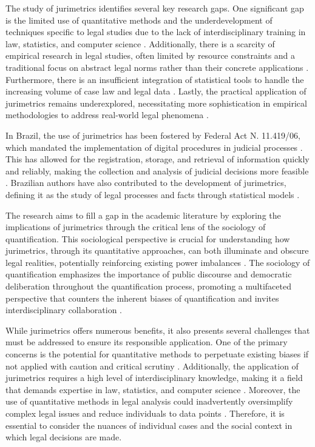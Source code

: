 The study of jurimetrics identifies several key research gaps. One significant gap is the limited use of quantitative methods and the underdevelopment of techniques specific to legal studies due to the lack of interdisciplinary training in law, statistics, and computer science \cite{nunes2018,nunes2018}. Additionally, there is a scarcity of empirical research in legal studies, often limited by resource constraints and a traditional focus on abstract legal norms rather than their concrete applications \cite{nunes2018}. Furthermore, there is an insufficient integration of statistical tools to handle the increasing volume of case law and legal data \cite{de2010}. Lastly, the practical application of jurimetrics remains underexplored, necessitating more sophistication in empirical methodologies to address real-world legal phenomena \cite{massuanganhe2016}.

In Brazil, the use of jurimetrics has been fostered by Federal Act N. 11.419/06, which mandated the implementation of digital procedures in judicial processes \cite{103390fi9040068}. This has allowed for the registration, storage, and retrieval of information quickly and reliably, making the collection and analysis of judicial decisions more feasible \cite{103390fi9040068}. Brazilian authors have also contributed to the development of jurimetrics, defining it as the study of legal processes and facts through statistical models \cite{silva2023role}.

The research aims to fill a gap in the academic literature by exploring the implications of jurimetrics through the critical lens of the sociology of quantification. This sociological perspective is crucial for understanding how jurimetrics, through its quantitative approaches, can both illuminate and obscure legal realities, potentially reinforcing existing power imbalances \cite{10.1590/data.2022.65.3.267,10.1080/07329113.2015.1046739}. The sociology of quantification emphasizes the importance of public discourse and democratic deliberation throughout the quantification process, promoting a multifaceted perspective that counters the inherent biases of quantification and invites interdisciplinary collaboration \cite{10.1590/data.2022.65.3.267,10.1080/07329113.2015.1046739}.

While jurimetrics offers numerous benefits, it also presents several challenges that must be addressed to ensure its responsible application. One of the primary concerns is the potential for quantitative methods to perpetuate existing biases if not applied with caution and critical scrutiny \cite{ccdacdfbcdaf,efbfffafaacadd}. Additionally, the application of jurimetrics requires a high level of interdisciplinary knowledge, making it a field that demands expertise in law, statistics, and computer science \cite{ccdacdfbcdaf,efbfffafaacadd}. Moreover, the use of quantitative methods in legal analysis could inadvertently oversimplify complex legal issues and reduce individuals to data points \cite{ccdacdfbcdaf,efbfffafaacadd}. Therefore, it is essential to consider the nuances of individual cases and the social context in which legal decisions are made.

